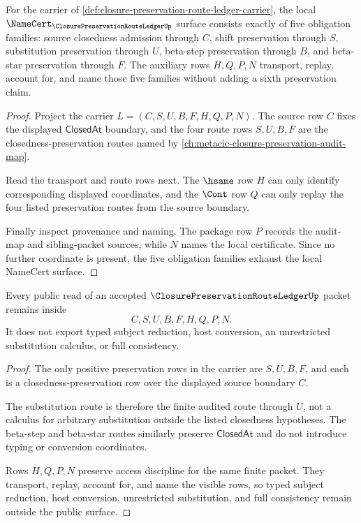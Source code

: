 \begin{theorem}
\label{thm:closure-preservation-route-ledger-namecert-obligations}
For the carrier of \autoref{def:closure-preservation-route-ledger-carrier}, the local $\NameCert_{\ClosurePreservationRouteLedgerUp}$ surface consists exactly of five obligation families: source closedness admission through $C$, shift preservation through $S$, substitution preservation through $U$, beta-step preservation through $B$, and beta-star preservation through $F$. The auxiliary rows $H,Q,P,N$ transport, replay, account for, and name those five families without adding a sixth preservation claim.
\end{theorem}
\begin{proof}
Project the carrier $L=(C,S,U,B,F,H,Q,P,N)$. The source row $C$ fixes the displayed $\mathsf{ClosedAt}$ boundary, and the four route rows $S,U,B,F$ are the closedness-preservation routes named by \autoref{ch:metacic-closure-preservation-audit-map}.

Read the transport and route rows next. The $\hsame$ row $H$ can only identify corresponding displayed coordinates, and the $\Cont$ row $Q$ can only replay the four listed preservation routes from the source boundary.

Finally inspect provenance and naming. The package row $P$ records the audit-map and sibling-packet sources, while $N$ names the local certificate. Since no further coordinate is present, the five obligation families exhaust the local NameCert surface.
\end{proof}

\begin{theorem}
\label{thm:closure-preservation-route-ledger-nonescape}
Every public read of an accepted $\ClosurePreservationRouteLedgerUp$ packet remains inside
$$
C,S,U,B,F,H,Q,P,N.
$$
It does not export typed subject reduction, host conversion, an unrestricted substitution calculus, or full consistency.
\end{theorem}
\begin{proof}
The only positive preservation rows in the carrier are $S,U,B,F$, and each is a closedness-preservation row over the displayed source boundary $C$.

The substitution route is therefore the finite audited route through $U$, not a calculus for arbitrary substitution outside the listed closedness hypotheses. The beta-step and beta-star routes similarly preserve $\mathsf{ClosedAt}$ and do not introduce typing or conversion coordinates.

Rows $H,Q,P,N$ preserve access discipline for the same finite packet. They transport, replay, account for, and name the visible rows, so typed subject reduction, host conversion, unrestricted substitution, and full consistency remain outside the public surface.
\end{proof}

